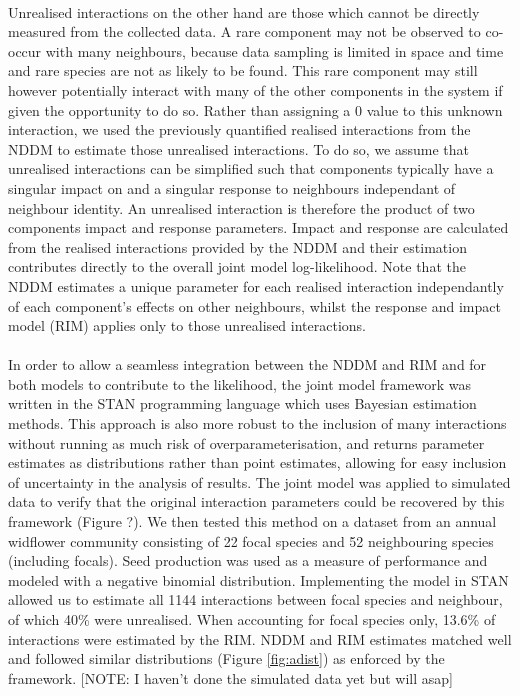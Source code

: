 \documentclass[a4,12pt]{article}
\begin{document}
\paragraph{}
    Unrealised interactions on the other hand are those which cannot be directly measured from the collected data. A rare component may not be observed to co-occur with many neighbours, because data sampling is limited in space and time and rare species are not as likely to be found. This rare component may still however potentially interact with many of the other components in the system if given the opportunity to do so. Rather than assigning a 0 value to this unknown interaction, we used the previously quantified realised interactions from the NDDM to estimate those unrealised interactions. To do so, we assume that unrealised interactions can be simplified such that components typically have a singular impact on and a singular response to neighbours independant of neighbour identity. An unrealised interaction is therefore the product of two components impact and response parameters. Impact and response are calculated from the realised interactions provided by the NDDM and their estimation contributes directly to the overall joint model log-likelihood. Note that the NDDM estimates a unique parameter for each realised interaction independantly of each component's effects on other neighbours, whilst the response and impact model (RIM) applies only to those unrealised interactions. 


\paragraph{}
    In order to allow a seamless integration between the NDDM and RIM and for both models to contribute to the likelihood, the joint model framework was written in the STAN programming language which uses Bayesian estimation methods. This approach is also more robust to the inclusion of many interactions without running as much risk of overparameterisation, and returns parameter estimates as distributions rather than point estimates, allowing for easy inclusion of uncertainty in the analysis of results. The joint model was applied to simulated data to verify that the original interaction parameters could be recovered by this framework (Figure ?). We then tested this method on a dataset from an annual widflower community consisting of 22 focal species and 52 neighbouring species (including focals). Seed production was used as a measure of performance and modeled with a negative binomial distribution. Implementing the model in STAN allowed us to estimate all 1144 interactions between focal species and neighbour, of which 40\% were unrealised. When accounting for focal species only, 13.6\% of interactions were estimated by the RIM. NDDM and RIM estimates matched well and followed similar distributions (Figure \ref{fig:adist}) as enforced by the framework. [NOTE: I haven't done the simulated data yet but will asap]
\end{document}
